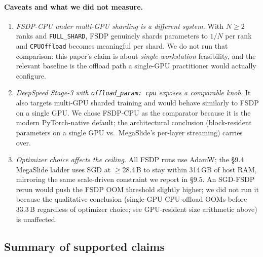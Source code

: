 \documentclass[11pt, letterpaper]{article}
\begin{document}
\paragraph{Caveats and what we did not measure.}
\begin{enumerate}
\item \emph{FSDP-CPU under multi-GPU sharding is a different system.} With $N \ge 2$ ranks and \texttt{FULL\_SHARD}, FSDP genuinely shards parameters to $1/N$ per rank and \texttt{CPUOffload} becomes meaningful per shard. We do not run that comparison: this paper's claim is about \emph{single-workstation} feasibility, and the relevant baseline is the offload path a single-GPU practitioner would actually configure.
\item \emph{DeepSpeed Stage-3 with \texttt{offload\_param: cpu} exposes a comparable knob.} It also targets multi-GPU sharded training and would behave similarly to FSDP on a single GPU. We chose FSDP-CPU as the comparator because it is the modern PyTorch-native default; the architectural conclusion (block-resident parameters on a single GPU vs.\ MegaSlide's per-layer streaming) carries over.
\item \emph{Optimizer choice affects the ceiling.} All FSDP runs use AdamW; the §9.4 MegaSlide ladder uses SGD at $\ge$28.4\,B to stay within 314\,GB of host RAM, mirroring the same scale-driven constraint we report in §9.5. An SGD-FSDP rerun would push the FSDP OOM threshold slightly higher; we did not run it because the qualitative conclusion (single-GPU CPU-offload OOMs before 33.3\,B regardless of optimizer choice; see GPU-resident size arithmetic above) is unaffected.
\end{enumerate}

\subsection{Summary of supported claims}
\end{document}
